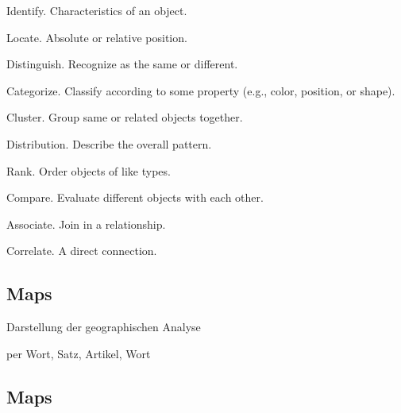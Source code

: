 \begin{todos}
    \item {}
    \item Identify. Characteristics of an object.
    \item Locate. Absolute or relative position.
    \item Distinguish. Recognize as the same or different.
    \item Categorize. Classify according to some property (e.g., color, position, or shape).
    \item Cluster. Group same or related objects together.
    \item Distribution. Describe the overall pattern.
    \item Rank. Order objects of like types.
    \item Compare. Evaluate different objects with each other.
    \item Associate. Join in a relationship.
    \item Correlate. A direct connection.
\end{todos}

\subsection{Maps}

\begin{todos}
    \item Darstellung der geographischen Analyse
    \item per Wort, Satz, Artikel, Wort
\end{todos}

\subsection{Maps}

%

